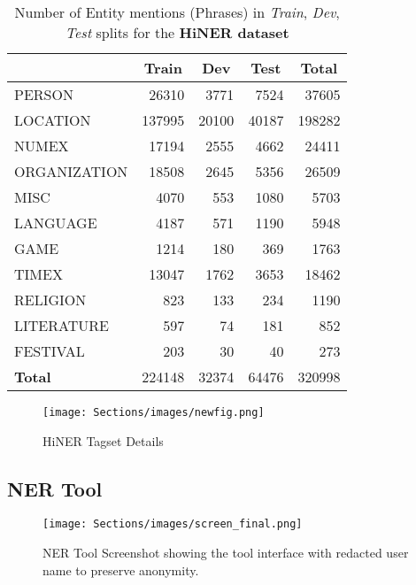 \documentclass[10pt, a4paper]{article}
\begin{document}
\begin{table}[!ht]
\centering
\begin{tabular}{@{}lrrr|r@{}}
\toprule
 & \multicolumn{1}{c}{\textbf{Train}} & \multicolumn{1}{c}{\textbf{Dev}} & \multicolumn{1}{c}{\textbf{Test}} & \multicolumn{1}{|c}{\textbf{Total}}  \\ \midrule
PERSON & 26310 & 3771 & 7524 & 37605\\ \midrule
LOCATION & 137995 & 20100 & 40187 & 198282\\ \midrule
NUMEX & 17194 & 2555 & 4662 & 24411\\ \midrule
ORGANIZATION & 18508 & 2645 & 5356 & 26509\\ \midrule
MISC & 4070 & 553 & 1080 & 5703\\ \midrule
LANGUAGE & 4187 & 571 & 1190 & 5948\\ \midrule
GAME & 1214 & 180 & 369 & 1763\\ \midrule
TIMEX & 13047 & 1762 & 3653 & 18462\\ \midrule
RELIGION & 823 & 133 & 234 & 1190\\ \midrule
LITERATURE & 597 & 74 & 181 & 852\\ \midrule
FESTIVAL & 203 & 30 & 40 & 273\\ \midrule
\textbf{Total} & 224148 & 32374 & 64476 & 320998\\
\bottomrule
\end{tabular}\caption{Number of Entity mentions (Phrases) in \textit{Train}, \textit{Dev}, \textit{Test} splits for the \textbf{HiNER dataset}}
\label{tab:dataStats}
\end{table}

\begin{figure}[!ht]
    \centering
    \texttt{[image: Sections/images/newfig.png]}
    \caption{HiNER Tagset Details}
    \label{fig:dataset}
\end{figure}

\subsection{NER Tool}

\begin{figure*}[t!]
    \centering
    \texttt{[image: Sections/images/screen\_final.png]}
    \caption{NER Tool Screenshot showing the tool interface with redacted user name to preserve anonymity. }
    \label{fig:screenshot}
\end{figure*}
\end{document}
